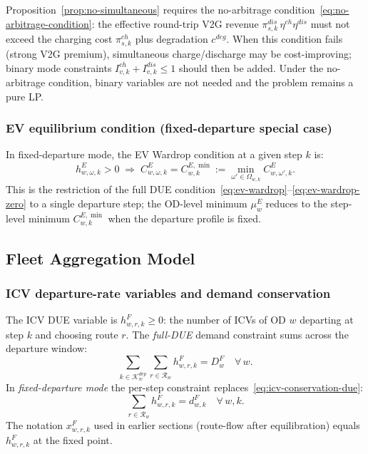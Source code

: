 \begin{remark}
  Proposition~\ref{prop:no-simultaneous} requires the no-arbitrage
  condition~\eqref{eq:no-arbitrage-condition}: the effective round-trip
  V2G revenue $\pi^{dis}_{s,k}\,\eta^{ch}\eta^{dis}$ must not exceed the
  charging cost $\pi^{ch}_{s,k}$ plus degradation $c^{deg}$.
  When this condition fails (strong V2G premium), simultaneous
  charge/discharge may be cost-improving; binary mode constraints
  $I^{ch}_{v,k}+I^{dis}_{v,k}\le 1$ should then be added.
  Under the no-arbitrage condition, binary variables are not needed and
  the problem remains a pure LP.
\end{remark}

\subsubsection{EV equilibrium condition (fixed-departure special case)}

In fixed-departure mode, the EV Wardrop condition at a given step $k$ is:
\begin{equation}
  h^E_{w,\omega,k} > 0 \;\Rightarrow\;
  C^E_{w,\omega,k} = C^{E,\min}_{w,k}
  := \min_{\omega' \in \Omega_{w,k}} C^E_{w,\omega',k}.
  \label{eq:ev-equilibrium}
\end{equation}
This is the restriction of the full DUE
condition~\eqref{eq:ev-wardrop}--\eqref{eq:ev-wardrop-zero} to a single
departure step; the OD-level minimum $\mu^E_w$ reduces to the step-level
minimum $C^{E,\min}_{w,k}$ when the departure profile is fixed.

\subsection{Fleet Aggregation Model}
\label{sec:traffic-fleet}

\subsubsection{ICV departure-rate variables and demand conservation}

The ICV DUE variable is $h^F_{w,r,k} \ge 0$: the number of ICVs of OD
$w$ departing at step $k$ and choosing route $r$.  The
\emph{full-DUE} demand constraint sums across the departure window:
\begin{equation}
  \sum_{k \in \mathcal{K}^{dep}_w}
  \sum_{r \in \mathcal{R}_w}
  h^F_{w,r,k}
  = D^F_w
  \quad \forall\, w.
  \label{eq:icv-conservation-due}
\end{equation}
In \emph{fixed-departure mode} the per-step constraint replaces~\eqref{eq:icv-conservation-due}:
\begin{equation}
  \sum_{r \in \mathcal{R}_w} h^F_{w,r,k} = d^F_{w,k}
  \quad \forall\, w, k.
  \label{eq:icv-conservation}
\end{equation}
The notation $x^F_{w,r,k}$ used in earlier sections (route-flow after
equilibration) equals $h^F_{w,r,k}$ at the fixed point.

